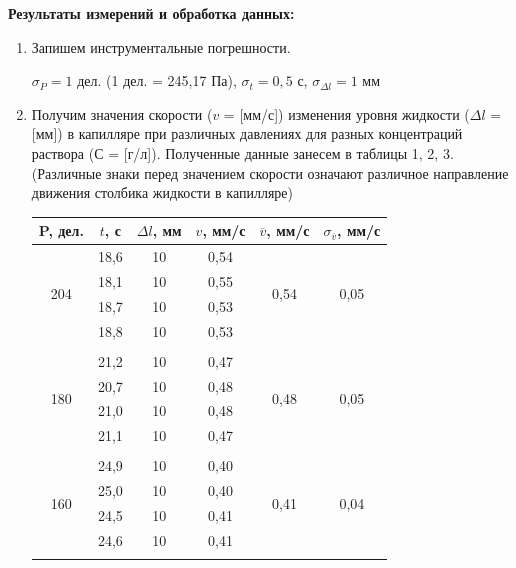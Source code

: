 \documentclass[a4paper, 12pt]{article}%
\begin{document}
	
    \textbf{Результаты измерений и обработка данных: }
	
	\begin{enumerate}
		\item Запишем инструментальные погрешности.
		
		$\sigma_P = 1$ дел. (1 дел. = 245,17 Па), 
		$\sigma_t = 0,5$ с, 
		$\sigma_{\Delta l} = 1$ мм
		
		\item  Получим значения скорости ($v$ = [мм/с]) изменения уровня жидкости ($\Delta l $ = [мм]) в капилляре при различных давлениях для разных концентраций раствора (С = [г/л]). Полученные данные занесем в таблицы 1, 2, 3. (Различные знаки перед значением скорости означают различное направление движения столбика жидкости в капилляре)
	\newpage
		\begin{longtable} {|c|c|c|c|c|c|}
		\hline
		P, дел. & $ t $, с &   $ \Delta l$, мм  & $v$,  мм/с   & $\overline v $, мм/с & $\sigma_{\overline v}$, мм/с\\ \hline
		 \multirow{4}{*}{204}& 18,6 & 10 & 0,54 &  \multirow{4}{*}{0,54}    & \multirow{4}{*}{0,05}\\ \cline{2-4}
		 & 18,1 & 10 &    0,55         &               &\\ \cline{2-4}
		 & 18,7 & 10 &     0,53         &              & \\ \cline{2-4}
		 & 18,8 & 10 &    0,53           &             &\\ \hline
		 &&&&&\\ \hline
		 
		  \multirow{4}{*}{180}& 21,2 & 10 & 0,47 &  \multirow{4}{*}{0,48}    & \multirow{4}{*}{0,05}\\ \cline{2-4}
		 & 20,7 & 10 &    0,48         &               &\\ \cline{2-4}
		 & 21,0 & 10 &     0,48         &              & \\ \cline{2-4}
		 & 21,1 & 10 &    0,47           &             &\\ \hline
		 &&&&&\\ \hline
		 
		  \multirow{4}{*}{160}& 24,9 & 10 & 0,40 &  \multirow{4}{*}{0,41}    & \multirow{4}{*}{0,04}\\ \cline{2-4}
		 & 25,0 & 10 &    0,40         &               &\\ \cline{2-4}
		 & 24,5 & 10 &     0,41         &              & \\ \cline{2-4}
		 & 24,6 & 10 &    0,41           &             &\\ \hline
		 &&&&&\\ \hline
		 

\end{longtable}
\end{enumerate}
\end{document}
